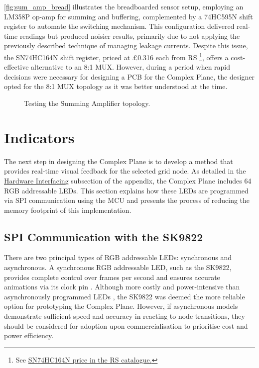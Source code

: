 \documentclass[12pt]{article}
\numberwithin{subsubsubsection}{subsubsection}
\begin{document}
\newpage

\autoref{fig:sum_amp_bread} illustrates the breadboarded sensor setup, employing an LM358P op-amp for summing and buffering, complemented by a 74HC595N shift register to automate the switching mechanism. This configuration delivered real-time readings but produced noisier results, primarily due to not applying the previously described technique of managing leakage currents. Despite this issue, the SN74HC164N shift register, priced at \pounds0.316 each from RS \cite{SN74HC164N}\footnote{See \href{https://uk.rs-online.com/web/p/counter-ics/1449993?searchId=f2644161-b9f3-4a05-a849-8905c162842c&gb=s}{SN74HC164N price in the RS catalogue.}}, offers a cost-effective alternative to an 8:1 MUX. However, during a period when rapid decisions were necessary for designing a PCB for the Complex Plane, the designer opted for the 8:1 MUX topology as it was better understood at the time.



\begin{figure}[H]
    \centering
    \caption{Testing the Summing Amplifier topology.}
    \label{fig:sum_amp_bread}
\end{figure}

\newpage
\section{Indicators}
\label{indicators}

The next step in designing the Complex Plane is to develop a method that provides real-time visual feedback for the selected grid node. As detailed in the \hyperref[appendix:hardwareinterfacing]{Hardware Interfacing} subsection of the appendix, the Complex Plane includes 64 RGB addressable LEDs. This section explains how these LEDs are programmed via SPI communication using the MCU and presents the process of reducing the memory footprint of this implementation.

\subsection{SPI Communication with the SK9822}

There are two principal types of RGB addressable LEDs: synchronous and asynchronous. A synchronous RGB addressable LED, such as the SK9822, provides complete control over frames per second and ensures accurate animations via its clock pin \cite{LED_strips}. Although more costly and power-intensive than asynchronously programmed LEDs \cite{LED_strips}, the SK9822 was deemed the more reliable option for prototyping the Complex Plane. However, if asynchronous models demonstrate sufficient speed and accuracy in reacting to node transitions, they should be considered for adoption upon commercialisation to prioritise cost and power efficiency.
\end{document}
